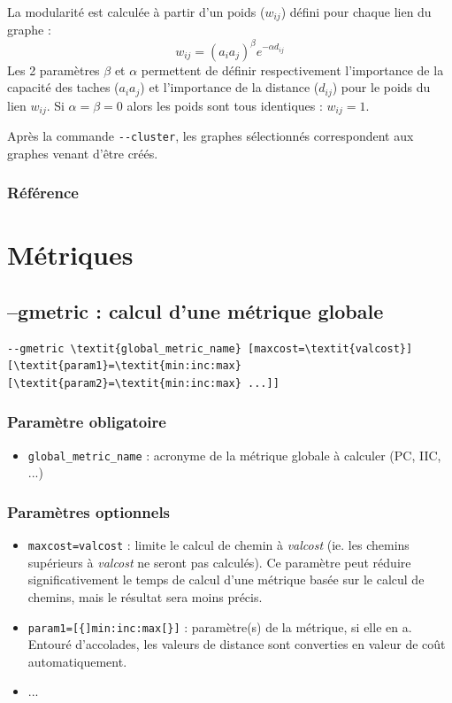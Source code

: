\documentclass[a4paper,10pt]{report}
\begin{document}
La modularité est calculée à partir d'un poids ($w_{ij}$) défini pour chaque lien du graphe :
$$w_{ij} = (a_i a_j)^\beta e^{-\alpha d_{ij}}$$
Les 2 paramètres $\beta$ et $\alpha$ permettent de définir respectivement l'importance de la capacité des taches ($a_i a_j$) et l'importance de la distance ($d_{ij}$) pour le poids du lien $w_{ij}$. Si $\alpha = \beta = 0$ alors les poids sont tous identiques : $w_{ij} = 1$.

Après la commande \verb|--cluster|, les graphes sélectionnés correspondent aux graphes venant d'être créés.

\subsubsection{Référence}
\cite{2017_clustering}


\section{Métriques}

\subsection{--gmetric : calcul d'une métrique globale}
\begin{Verbatim}[commandchars=\\\{\}]
--gmetric \textit{global_metric_name} [maxcost=\textit{valcost}] [\textit{param1}=\textit{min:inc:max} [\textit{param2}=\textit{min:inc:max} ...]]
\end{Verbatim}

\subsubsection{Paramètre obligatoire}
\begin{itemize}
	\item \verb|global_metric_name| : acronyme de la métrique globale à calculer (PC, IIC, ...)
\end{itemize}

\subsubsection{Paramètres optionnels}
\begin{itemize}
	\item \verb|maxcost=valcost| : limite le calcul de chemin à \textit{valcost} (ie. les chemins supérieurs à \textit{valcost} ne seront pas calculés). Ce paramètre peut réduire significativement le temps de calcul d'une métrique basée sur le calcul de chemins, mais le résultat sera moins précis.
	\item \verb|param1=[{]min:inc:max[}]| : paramètre(s) de la métrique, si elle en a. Entouré d'accolades, les valeurs de distance sont converties en valeur de coût automatiquement.
	\item ...
\end{itemize}
\end{document}
